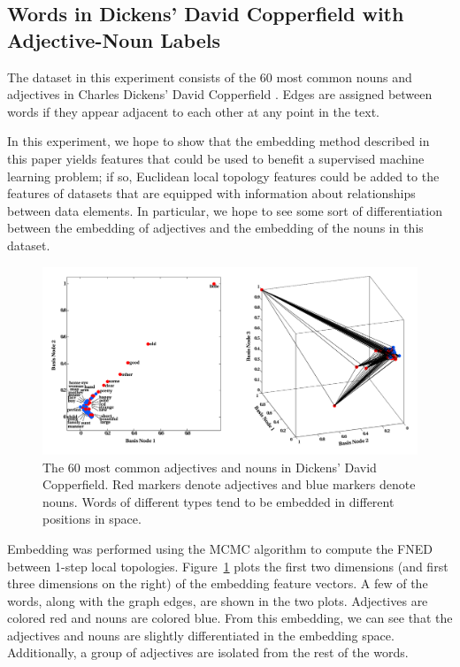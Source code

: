 \documentclass{article}
\begin{document}
\subsection{Words in Dickens' David Copperfield with Adjective-Noun Labels}

The dataset in this experiment consists of the 60 most common nouns and adjectives in Charles Dickens' David Copperfield \cite{newman2006finding}. Edges are assigned between words if they appear adjacent to each other at any point in the text.

In this experiment, we hope to show that the embedding method described in this paper yields features that could be used to benefit a supervised machine learning problem; if so, Euclidean local topology features could be added to the features of datasets that are equipped with information about relationships between data elements. In particular, we hope to see some sort of differentiation between the embedding of adjectives and the embedding of the nouns in this dataset.

\begin{figure}[!]
  \centering               
  \includegraphics[width=1\textwidth]{../img/demo6_dickensCopperfield/dickensFigure.pdf}
  \caption{The 60 most common adjectives and nouns in Dickens' David Copperfield. Red markers denote adjectives and blue markers denote nouns. Words of different types tend to be embedded in different positions in space.}
  \label{fig:dickensCopperfield}
\end{figure}

Embedding was performed using the MCMC algorithm to compute the FNED between 1-step local topologies. Figure~\ref{fig:dickensCopperfield} plots the first two dimensions (and first three dimensions on the right) of the embedding feature vectors. A few of the words, along with the graph edges, are shown in the two plots. Adjectives are colored red and nouns are colored blue. From this embedding, we can see that the adjectives and nouns are slightly differentiated in the embedding space. Additionally, a group of adjectives are isolated from the rest of the words.
\end{document}
